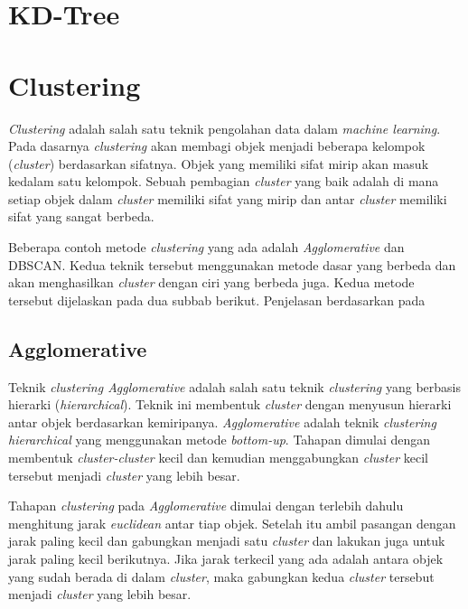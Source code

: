 \section{KD-Tree}
\label{sec:kdtree}

\section{Clustering}
\label{sec:clustering}
\textit{Clustering} adalah salah satu teknik pengolahan data dalam \textit{machine learning}. Pada dasarnya \textit{clustering} akan membagi objek menjadi beberapa kelompok (\textit{cluster}) berdasarkan sifatnya. Objek yang memiliki sifat mirip akan masuk kedalam satu kelompok. Sebuah pembagian \textit{cluster} yang baik adalah di mana setiap objek dalam \textit{cluster} memiliki sifat yang mirip dan antar \textit{cluster} memiliki sifat yang sangat berbeda.

Beberapa contoh metode \textit{clustering} yang ada adalah \textit{Agglomerative} dan DBSCAN. Kedua teknik tersebut menggunakan metode dasar yang berbeda dan akan menghasilkan \textit{cluster} dengan ciri yang berbeda juga. Kedua metode tersebut dijelaskan pada dua subbab berikut. Penjelasan berdasarkan pada~\cite{han2011data}

\subsection{Agglomerative}
\label{subsec:clustering_agglomerative}
Teknik \textit{clustering Agglomerative} adalah salah satu teknik \textit{clustering} yang berbasis hierarki (\textit{hierarchical}). Teknik ini membentuk \textit{cluster} dengan menyusun hierarki antar objek berdasarkan kemiripanya. \textit{Agglomerative} adalah teknik \textit{clustering hierarchical} yang menggunakan metode \textit{bottom-up}. Tahapan dimulai dengan membentuk \textit{cluster-cluster} kecil dan kemudian menggabungkan \textit{cluster} kecil tersebut menjadi \textit{cluster} yang lebih besar.

Tahapan \textit{clustering} pada \textit{Agglomerative} dimulai dengan terlebih dahulu menghitung jarak \textit{euclidean} antar tiap objek. Setelah itu ambil pasangan dengan jarak paling kecil dan gabungkan menjadi satu \textit{cluster} dan lakukan juga untuk jarak paling kecil berikutnya. Jika jarak terkecil yang ada adalah antara objek yang sudah berada di dalam \textit{cluster}, maka gabungkan kedua \textit{cluster} tersebut menjadi \textit{cluster} yang lebih besar. 

